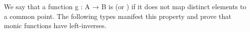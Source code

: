We say that a function \ab g \as : \ab A \as → \ab B is  (or ) if it does not map distinct elements to a common point. The following types manifest this property and prove that monic functions have left-inverses.
\ccpad
\begin{code}%
\>[1]\AgdaSpace{}%
\AgdaSymbol{:}\AgdaSpace{}%
\AgdaSymbol{(}\AgdaSpace{}%
\AgdaSymbol{:}\AgdaSpace{}%
\AgdaSpace{}%
\AgdaSpace{}%
\AgdaSymbol{)}\AgdaSpace{}%
\AgdaSpace{}%
\AgdaSpace{}%
\AgdaSpace{}%
\AgdaSpace{}%
\<%
\\
%
\>[1]\AgdaSpace{}%
\AgdaSpace{}%
\AgdaSymbol{=}\AgdaSpace{}%
\AgdaSpace{}%
\AgdaSpace{}%
\AgdaSpace{}%
\AgdaSpace{}%
\AgdaSpace{}%
\AgdaSpace{}%
\AgdaSpace{}%
\AgdaSpace{}%
\AgdaSpace{}%
\AgdaSpace{}%
\AgdaSpace{}%
\AgdaSpace{}%
\<%
\end{code}
\scpad
\begin{code}%
\>[1]\AgdaSpace{}%
\AgdaSymbol{:}\AgdaSpace{}%
\AgdaSymbol{(}\AgdaSpace{}%
\AgdaSymbol{:}\AgdaSpace{}%
\AgdaSpace{}%
\AgdaSpace{}%
\AgdaSymbol{)}\AgdaSpace{}%
\AgdaSpace{}%
\AgdaSpace{}%
\AgdaSpace{}%
\AgdaSpace{}%
\AgdaSymbol{(}\AgdaSpace{}%
\AgdaSymbol{:}\AgdaSpace{}%
\AgdaSymbol{)}\AgdaSpace{}%
\AgdaSpace{}%
\AgdaSpace{}%
\AgdaSpace{}%
\AgdaSpace{}%
\AgdaSpace{}%
\AgdaSpace{}%
\<%
\\
%
\>[1]\AgdaSpace{}%
\AgdaSpace{}%
\AgdaSymbol{\AgdaUnderscore{}}\AgdaSpace{}%
\AgdaSymbol{=}\AgdaSpace{}%
\AgdaSpace{}%
\AgdaSpace{}%
\AgdaSpace{}%
\AgdaSpace{}%
\AgdaSpace{}%
\AgdaSpace{}%
\<%
\end{code}
\scpad
